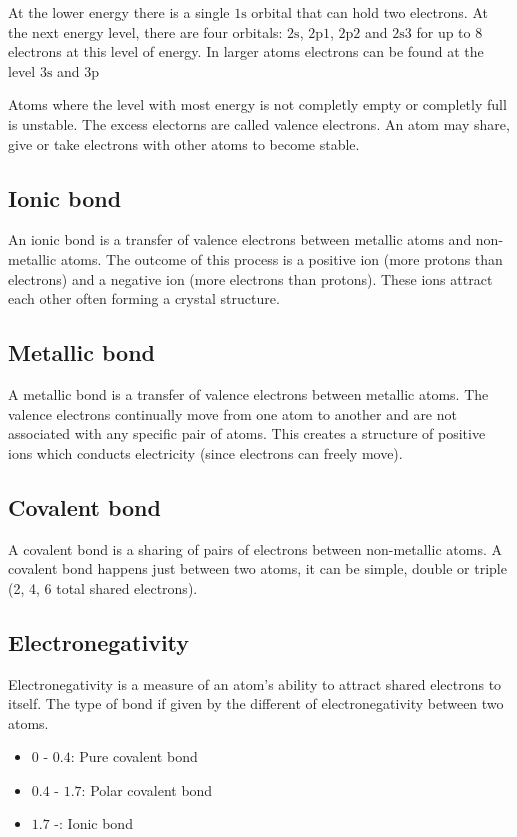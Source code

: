 \documentclass{article}
\begin{document}
At the lower energy there is a single \(1\text{s}\) orbital that can hold two electrons.
At the next energy level, there are four orbitals:
\(2\text{s}\), \(2\text{p}1\), \(2\text{p}2\) and \(2\text{s}3\) for up to 8 electrons at this level of energy.
In larger atoms electrons can be found at the level \(3\text{s}\) and \(3\text{p}\)

Atoms where the level with most energy is not completly empty or completly full is unstable.
The excess electorns are called valence electrons. An atom may share, give or take electrons
with other atoms to become stable.

\subsection{Ionic bond}

An ionic bond is a transfer of valence electrons between metallic atoms and non-metallic atoms.
The outcome of this process is a positive ion (more protons than electrons)
and a negative ion (more electrons than protons). These ions attract each other often
forming a crystal structure.

\subsection{Metallic bond}

A metallic bond is a transfer of valence electrons between metallic atoms.
The valence electrons continually move from one atom to another and are not
associated with any specific pair of atoms. This creates a structure of positive ions
which conducts electricity (since electrons can freely move).

\subsection{Covalent bond}

A covalent bond is a sharing of pairs of electrons between non-metallic atoms.
A covalent bond happens just between two atoms, it can be simple, double or triple (2, 4, 6 total shared electrons).

\subsection{Electronegativity}

Electronegativity is a measure of an atom's ability to attract shared electrons to itself.
The type of bond if given by the different of electronegativity between two atoms.
\begin{itemize}
    \item \(0\) - \(0.4\): Pure covalent bond
    \item \(0.4\) - \(1.7\): Polar covalent bond
    \item \(1.7\) -: Ionic bond
\end{itemize}
\end{document}
